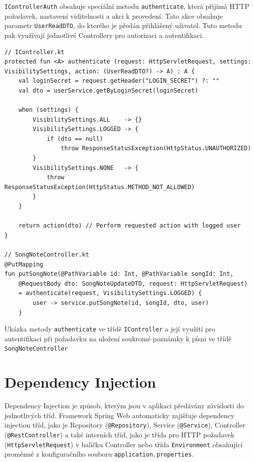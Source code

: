 \texttt{IControllerAuth} obsahuje speciální metodu \texttt{authenticate}, která přijímá HTTP požadavek, nastavení viditelnosti a akci k provedení. Tato akce obsahuje parametr \texttt{UserReadDTO}, do kterého je předán přihlášený uživatel. Tuto metodu pak využívají jednotlivé Controllery pro autorizaci a autentifikaci.

\begin{listing}[H]
\begin{verbatim}
// IController.kt
protected fun <A> authenticate (request: HttpServletRequest, settings: VisibilitySettings, action: (UserReadDTO?) -> A) : A {
    val loginSecret = request.getHeader("LOGIN_SECRET") ?: ""
    val dto = userService.getByLoginSecret(loginSecret)
    
    when (settings) {
        VisibilitySettings.ALL    -> {}
        VisibilitySettings.LOGGED -> {
            if (dto == null) 
                throw ResponseStatusException(HttpStatus.UNAUTHORIZED)
        }
        VisibilitySettings.NONE   -> {
            throw ResponseStatusException(HttpStatus.METHOD_NOT_ALLOWED)
        }
    }
    
    return action(dto) // Perform requested action with logged user
}

// SongNoteController.kt
@PutMapping
fun putSongNote(@PathVariable id: Int, @PathVariable songId: Int, 
    @RequestBody dto: SongNoteUpdateDTO, request: HttpServletRequest)
    = authenticate(request, VisibilitySettings.LOGGED) {
        user -> service.putSongNote(id, songId, dto, user)
    }
\end{verbatim}
\caption[Ukázka autentifikace na serveru]{Ukázka metody \texttt{authenticate} ve třídě \texttt{IController} a její využití pro autentifikaci při požadavku na uložení soukromé poznámky k písni ve třídě \texttt{SongNoteController}}
\end{listing}

\section{Dependency Injection}

Dependency Injection je způsob, kterým jsou v aplikaci předávány závislosti do jednotlivých tříd. Framework Spring Web automaticky zajišťuje dependency injection tříd, jako je Repository (\texttt{@Repository}), Service (\texttt{@Service}), Controller (\texttt{@RestController}) a také interních tříd, jako je třída pro HTTP požadavek (\texttt{HttpServletRequest}) v balíčku Controller nebo třída \texttt{Environment} obsahující proměnné z konfiguračního souboru \texttt{application.properties}.

